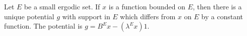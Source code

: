 Let $E$ be a small ergodic set. If $x$ is a function bounded on $E$, then there is a unique potential $g$ with support in $E$ which differs from $x$ on $E$ by a constant function. The potential is $g = B^E x - (\lambda^E x)1$.
